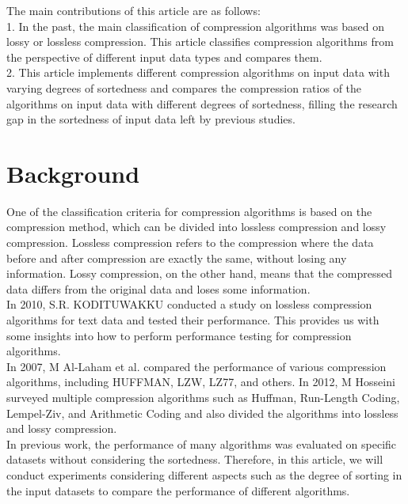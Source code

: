 \documentclass[sigconf]{acmart}
\begin{document}
    The main contributions of this article are as follows: \\
    1. In the past, the main classification of compression algorithms was based on lossy or lossless compression. This article classifies compression algorithms from the perspective of different input data types and compares them. \\
    2. This article implements different compression algorithms on input data with varying degrees of sortedness and compares the compression ratios of the algorithms on input data with different degrees of sortedness, filling the research gap in the sortedness of input data left by previous studies.

\section{Background}

    One of the classification criteria for compression algorithms is based on the compression method, which can be divided into lossless compression and lossy compression. Lossless compression refers to the compression where the data before and after compression are exactly the same, without losing any information. Lossy compression, on the other hand, means that the compressed data differs from the original data and loses some information.\\
    In 2010, S.R. KODITUWAKKU conducted a study on lossless compression algorithms for text data and tested their performance.\cite{LosslessDataCompression} This provides us with some insights into how to perform performance testing for compression algorithms.\\
    In 2007, M Al-Laham et al. compared the performance of various compression algorithms, including HUFFMAN, LZW, LZ77, and others\cite{al2007comparative}. In 2012, M Hosseini surveyed multiple compression algorithms such as Huffman, Run-Length Coding, Lempel-Ziv, and Arithmetic Coding and also divided the algorithms into lossless and lossy compression\cite{hosseini2012survey}.\\
    In previous work, the performance of many algorithms was evaluated on specific datasets without considering the sortedness. Therefore, in this article, we will conduct experiments considering different aspects such as the degree of sorting in the input datasets to compare the performance of different algorithms.
\end{document}
